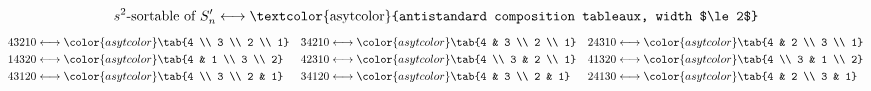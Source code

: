 \documentclass{beamer}
\newcommand{\arw}{\longleftrightarrow}
\begin{document}
\begin{frame}
    \[\text{$s^2$-sortable of $S_n'$} \arw \text{\textcolor{asytcolor}{antistandard composition tableaux, width $\le 2$}}\]
    \begin{align*}
        43210 &\arw {\color{asytcolor}\tab{4 \\ 3 \\ 2 \\ 1}} &
        34210 &\arw {\color{asytcolor}\tab{4 & 3 \\ 2 \\ 1}} &
        24310 &\arw {\color{asytcolor}\tab{4 & 2 \\ 3 \\ 1}} \\
        14320 &\arw {\color{asytcolor}\tab{4 & 1 \\ 3 \\ 2}} &
        42310 &\arw {\color{asytcolor}\tab{4 \\ 3 & 2 \\ 1}} &
        41320 &\arw {\color{asytcolor}\tab{4 \\ 3 & 1 \\ 2}} \\
        43120 &\arw {\color{asytcolor}\tab{4 \\ 3 \\ 2 & 1}} &
        34120 &\arw {\color{asytcolor}\tab{4 & 3 \\ 2 & 1}} &
        24130 &\arw {\color{asytcolor}\tab{4 & 2 \\ 3 & 1}}
    \end{align*}
\end{frame}
\end{document}

